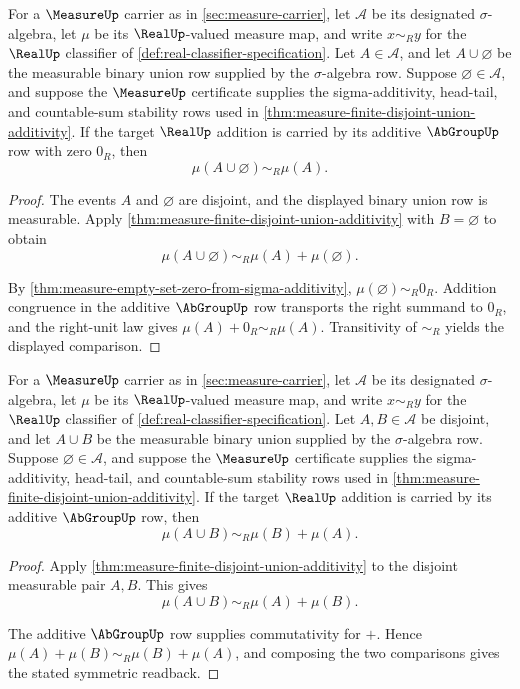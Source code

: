 \begin{theorem}
\label{thm:measure-empty-union-right-unit}
For a $\MeasureUp$ carrier as in \autoref{sec:measure-carrier}, let $\mathcal{A}$ be its designated $\sigma$-algebra, let $\mu$ be its $\RealUp$-valued measure map, and write $x\sim_R y$ for the $\RealUp$ classifier of \autoref{def:real-classifier-specification}. Let $A\in\mathcal{A}$, and let $A\cup\varnothing$ be the measurable binary union row supplied by the $\sigma$-algebra row. Suppose $\varnothing\in\mathcal{A}$, and suppose the $\MeasureUp$ certificate supplies the sigma-additivity, head-tail, and countable-sum stability rows used in \autoref{thm:measure-finite-disjoint-union-additivity}. If the target $\RealUp$ addition is carried by its additive $\AbGroupUp$ row with zero $0_R$, then
$$
\mu(A\cup\varnothing)\sim_R\mu(A).
$$
\end{theorem}
\begin{proof}
The events $A$ and $\varnothing$ are disjoint, and the displayed binary union
row is measurable. Apply
\autoref{thm:measure-finite-disjoint-union-additivity} with
$B=\varnothing$ to obtain
$$
\mu(A\cup\varnothing)\sim_R\mu(A)+\mu(\varnothing).
$$

By \autoref{thm:measure-empty-set-zero-from-sigma-additivity},
$\mu(\varnothing)\sim_R0_R$. Addition congruence in the additive
$\AbGroupUp$ row transports the right summand to $0_R$, and the right-unit
law gives $\mu(A)+0_R\sim_R\mu(A)$. Transitivity of $\sim_R$ yields the
displayed comparison.
\end{proof}

\begin{theorem}
\label{thm:measure-disjoint-union-symmetry}
For a $\MeasureUp$ carrier as in \autoref{sec:measure-carrier}, let $\mathcal{A}$ be its designated $\sigma$-algebra, let $\mu$ be its $\RealUp$-valued measure map, and write $x\sim_R y$ for the $\RealUp$ classifier of \autoref{def:real-classifier-specification}. Let $A,B\in\mathcal{A}$ be disjoint, and let $A\cup B$ be the measurable binary union supplied by the $\sigma$-algebra row. Suppose $\varnothing\in\mathcal{A}$, and suppose the $\MeasureUp$ certificate supplies the sigma-additivity, head-tail, and countable-sum stability rows used in \autoref{thm:measure-finite-disjoint-union-additivity}. If the target $\RealUp$ addition is carried by its additive $\AbGroupUp$ row, then
$$
\mu(A\cup B)\sim_R\mu(B)+\mu(A).
$$
\end{theorem}
\begin{proof}
Apply \autoref{thm:measure-finite-disjoint-union-additivity} to the
disjoint measurable pair $A,B$. This gives
$$
\mu(A\cup B)\sim_R\mu(A)+\mu(B).
$$

The additive $\AbGroupUp$ row supplies commutativity for $+$. Hence
$\mu(A)+\mu(B)\sim_R\mu(B)+\mu(A)$, and composing the two comparisons gives
the stated symmetric readback.
\end{proof}

